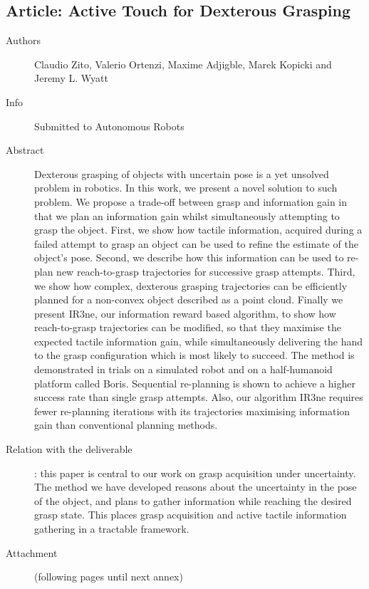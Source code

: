 \documentclass[a4paper,11pt,pdf]{pacmanreport}
\begin{document}
\subsection{Article: Active Touch for Dexterous Grasping}
\label{ann:activetouch}
\begin{description}
    \item[Authors] Claudio Zito, Valerio Ortenzi, Maxime Adjigble, Marek Kopicki and Jeremy L. Wyatt
    \item[Info] Submitted to Autonomous Robots
    \item[Abstract] Dexterous grasping of objects with uncertain pose is a yet unsolved problem in robotics. In this work, we present a novel solution to such problem. We propose a trade-off between grasp and information gain in that we plan an information gain whilst simultaneously attempting to grasp the object. First, we show how tactile information, acquired during a failed attempt to grasp an object can be used to refine the estimate of the object's pose. Second, we describe how this information can be used to re-plan new reach-to-grasp trajectories for successive grasp attempts. Third, we show how complex, dexterous grasping trajectories can be efficiently planned for a non-convex object described as a point cloud. Finally we present IR3ne, our information reward based algorithm, to show how reach-to-grasp trajectories can be modified, so that they maximise the expected tactile information gain, while simultaneously delivering the hand to the grasp configuration which is most likely to succeed. The method is demonstrated in trials on a simulated robot and on a half-humanoid platform called Boris. Sequential re-planning is shown to achieve a higher success rate than single grasp attempts. Also, our algorithm IR3ne requires fewer re-planning iterations with its trajectories maximising information gain than conventional planning methods.

    \item[Relation with the deliverable]: this paper is central to our work on grasp acquisition under uncertainty. The method we have developed reasons about the uncertainty in the pose of the object, and plans to gather information while reaching the desired grasp state. This places grasp acquisition and active tactile information gathering in a tractable framework.
    \item[Attachment] (following pages until next annex)
\end{description}

\end{document}
